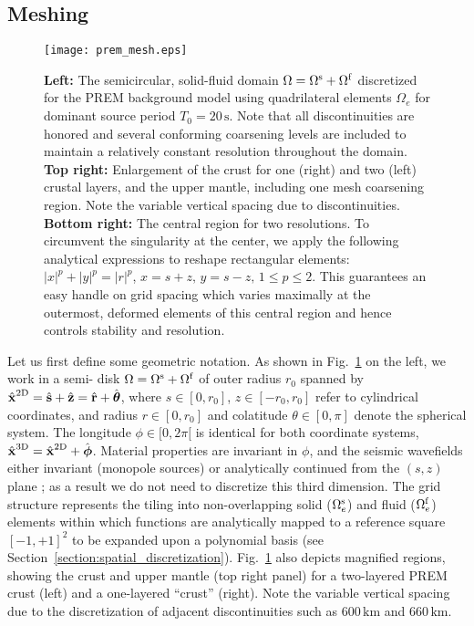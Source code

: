 \documentclass[11pt,letter,fleqn,english,notitlepage]{article}
\newcommand{\brh}{\mbox{$\hat{\mbox{${\bf r}$}}$}}
\newcommand{\bsh}{\mbox{$\hat{\mbox{${\bf s}$}}$}}
\newcommand{\bxh}{\mbox{$\hat{\mbox{${\bf x}$}}$}}
\newcommand{\bzh}{\mbox{$\hat{\mbox{${\bf z}$}}$}}
\newcommand{\bthetah}{\mbox{$\hat{\mbox{\boldmath $\bf \theta$}}$}}
\newcommand{\bphih}{\mbox{$\hat{\mbox{\boldmath $\bf \phi$}}$}}
\begin{document}
\subsection{Meshing}
\begin{figure*}[htb!]
\begin{center}
\texttt{[image: prem\_mesh.eps]}
\caption{\textbf{Left:} The semicircular, solid-fluid 
domain $\Omega=\Omega^{\rm s} + \Omega^{\rm f}$
discretized for the PREM background model using
quadrilateral elements $\Omega_e$ for dominant source period $T_0=20\, \textrm{s}$.
Note that all discontinuities are honored and several 
conforming coarsening levels are included to maintain a relatively 
constant resolution throughout the domain. 
\textbf{Top right:} Enlargement of the crust for one (right) and two (left) crustal
layers, and the upper mantle, including one mesh coarsening region. 
Note the variable vertical spacing due to discontinuities.
\textbf{Bottom right:} The central region for two resolutions. 
To circumvent the singularity at the center, 
we apply the following analytical expressions to reshape rectangular elements: 
$\left|{x}\right|^p+\left|{y}\right|^p=\left|{r}\right|^p$, 
$x=s+z,\,y=s-z,\,1\le p \le 2$.
This guarantees an easy handle on grid spacing which varies maximally 
at the outermost, deformed elements of this central region and hence 
controls stability and resolution.}
\label{img:prem_mesh}
\end{center}
\end{figure*}

Let us first define some geometric notation. As shown in 
Fig.~\ref{img:prem_mesh} on the left, we work in a semi- disk 
$\Omega=\Omega^{\rm s} + \Omega^{\rm f}$ of outer 
radius $r_0$ spanned by $\bxh^{\rm 2D}=\bsh + \bzh=\brh+\bthetah$,
where $s\in [0,r_0]$, $z\in [-r_0,r_0]$ refer to cylindrical coordinates, and
radius $r\in [0,r_0]$ and colatitude $\theta\in [0,\pi]$ denote the spherical system. 
The longitude $\phi\in [0,2\pi[$ is identical for both coordinate systems, 
$\bxh^{\rm 3D}=\bxh^{\rm 2D}+\bphih$.  Material properties are invariant in 
$\phi$, and the seismic wavefields either invariant (monopole sources) or analytically 
continued from the $(s,z)$ plane \citep{nissen+:07a}; as a result we do not need 
to discretize this third dimension. The grid structure represents the tiling into
non-overlapping solid ($\Omega_e^{\rm s}$) and fluid ($\Omega_e^{\rm f}$) 
elements within which functions are analytically mapped to a reference square
$[-1,+1]^2$ to be expanded upon a polynomial basis 
(see Section~\ref{section:spatial_discretization}).
Fig.~\ref{img:prem_mesh} also depicts magnified regions, showing 
the crust and upper mantle (top right panel) for a two-layered PREM \citep{prem}
crust (left) and a one-layered ``crust'' (right). Note the variable vertical spacing due to the 
discretization of adjacent discontinuities such as $600\,\textrm{km}$ and 
$660\, \textrm{km}$. 
\end{document}
